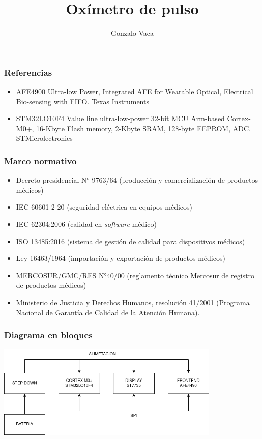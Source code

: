 \documentclass[spanish]{beamer}
\title{Oxímetro de pulso}
\author{Gonzalo Vaca}
\begin{document}
\maketitle

\begin{frame}
    \frametitle{Referencias}
    \begin{itemize}
        \item AFE4900 Ultra-low Power, Integrated AFE for Wearable Optical, Electrical Bio-sensing with FIFO. Texas Instruments
        \item STM32LO10F4 Value line ultra-low-power 32-bit MCU Arm-based Cortex-M0+, 16-Kbyte Flash memory, 2-Kbyte SRAM, 128-byte EEPROM, ADC. STMicrolectronics
    \end{itemize}
\end{frame}

\begin{frame}
    \frametitle{Marco normativo}
    \begin{itemize}
        \item Decreto presidencial N° 9763/64 (producción y comercialización de productos médicos)
        \item IEC 60601-2-20 (seguridad eléctrica en equipos médicos)
        \item IEC 62304:2006 (calidad en \emph{software} médico)
        \item ISO 13485:2016 (sistema de gestión de calidad para dispositivos médicos)
        \item Ley 16463/1964 (importación y exportación de productos médicos)
        \item MERCOSUR/GMC/RES N°40/00 (reglamento técnico Mercosur de registro de productos médicos)
        \item Ministerio de Justicia y Derechos Humanos, resolución 41/2001 (Programa Nacional de Garantía de Calidad de la Atención Humana).
    \end{itemize}
\end{frame}

\begin{frame}
    \frametitle{Diagrama en bloques}
    \centering
    \includegraphics[width=0.8\textwidth]{img/bloques.png}
\end{frame}
\end{document}
